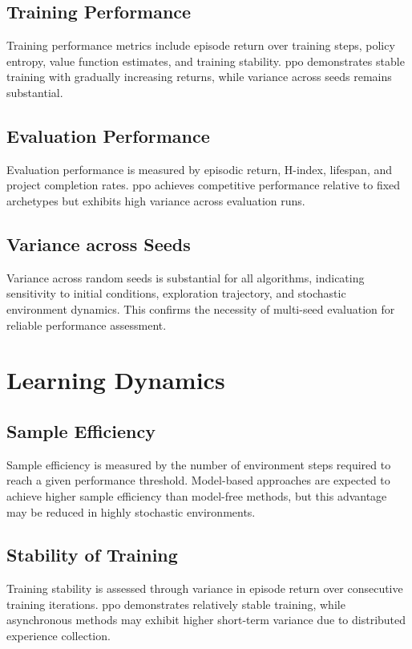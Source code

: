 \documentclass[english,bachelor]{hsluthesis}
\begin{document}
\subsection{Training Performance}
Training performance metrics include episode return over training steps, policy entropy, value function estimates, and training stability. \gls{ppo} demonstrates stable training with gradually increasing returns, while variance across seeds remains substantial.

\subsection{Evaluation Performance}
Evaluation performance is measured by episodic return, H-index, lifespan, and project completion rates. \gls{ppo} achieves competitive performance relative to fixed archetypes but exhibits high variance across evaluation runs.

\subsection{Variance across Seeds}
Variance across random seeds is substantial for all algorithms, indicating sensitivity to initial conditions, exploration trajectory, and stochastic environment dynamics. This confirms the necessity of multi-seed evaluation for reliable performance assessment.

\section{Learning Dynamics}

\subsection{Sample Efficiency}
Sample efficiency is measured by the number of environment steps required to reach a given performance threshold. Model-based approaches are expected to achieve higher sample efficiency than model-free methods, but this advantage may be reduced in highly stochastic environments.

\subsection{Stability of Training}
Training stability is assessed through variance in episode return over consecutive training iterations. \gls{ppo} demonstrates relatively stable training, while asynchronous methods may exhibit higher short-term variance due to distributed experience collection.
\end{document}
